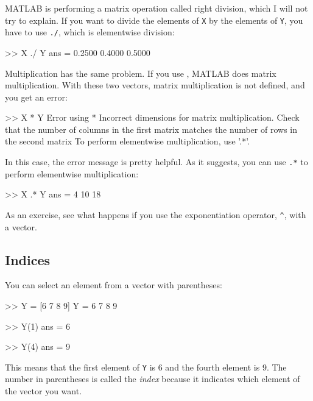 MATLAB is performing a matrix operation called right division, which I will not try to explain. If you want to divide the elements of {\tt X} by the elements of {\tt Y}, you have to use {\tt ./}, which is elementwise division:

\begin{code}
>> X ./ Y
ans = 0.2500    0.4000    0.5000
\end{code}

Multiplication has the same problem.  If you use {\tt *}, MATLAB does matrix multiplication.  With these two vectors, matrix multiplication is not defined, and you get an error:

\begin{code}
>> X * Y
Error using  * 
Incorrect dimensions for matrix multiplication. 
Check that the number of columns in the first matrix 
matches the number of rows in the second matrix
To perform elementwise multiplication, use '.*'.
\end{code}

In this case, the error message is pretty helpful.  As it suggests, you can use {\tt .*} to perform elementwise multiplication:


\begin{code}
>> X .* Y
ans = 4    10    18
\end{code}

As an exercise, see what happens if you use the exponentiation operator,
\verb"^", with a vector.


\subsection{Indices}


You can select an element from a vector with parentheses:

\begin{code}
>> Y = [6 7 8 9]
Y = 6    7     8     9

>> Y(1)
ans = 6

>> Y(4)
ans = 9
\end{code}

This means that the first element of {\tt Y} is 6 and the
fourth element is 9.
The number in parentheses is called the \emph{index} because it indicates which element of the vector you want.



